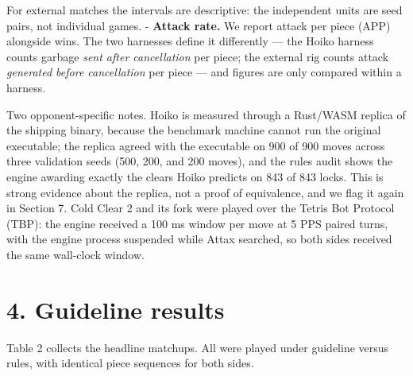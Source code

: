\documentclass[
  11pt,
]{article}
\begin{document}
For external matches the intervals are descriptive: the independent
units are seed pairs, not individual games. - \textbf{Attack rate.} We
report attack per piece (APP) alongside wins. The two harnesses define
it differently --- the Hoiko harness counts garbage \emph{sent after
cancellation} per piece; the external rig counts attack \emph{generated
before cancellation} per piece --- and figures are only compared within
a harness.

Two opponent-specific notes. Hoiko is measured through a Rust/WASM
replica of the shipping binary, because the benchmark machine cannot run
the original executable; the replica agreed with the executable on 900
of 900 moves across three validation seeds (500, 200, and 200 moves),
and the rules audit shows the engine awarding exactly the clears Hoiko
predicts on 843 of 843 locks. This is strong evidence about the replica,
not a proof of equivalence, and we flag it again in Section 7. Cold
Clear 2 and its fork were played over the Tetris Bot Protocol (TBP): the
engine received a 100 ms window per move at 5 PPS paired turns, with the
engine process suspended while Attax searched, so both sides received
the same wall-clock window.

\section{4. Guideline results}\label{guideline-results}

Table 2 collects the headline matchups. All were played under guideline
versus rules, with identical piece sequences for both sides.
\end{document}
